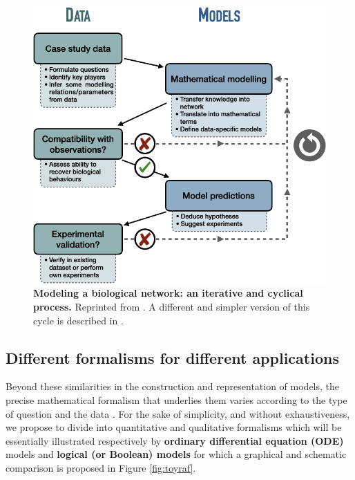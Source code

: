 \documentclass[a4paper,12pt,twoside,onecolumn,openright,final,oldfontcommands]{memoir}
\begin{document}
\begin{figure}

{\centering \includegraphics[width=0.7\linewidth]{fig/cycle} 

}

\caption[Modeling a biological network: an iterative and cyclical process]{\textbf{Modeling a biological network: an iterative
and cyclical process.} Reprinted from \citep{beal2020modelisation}. A
different and simpler version of this cycle is described in
\citep{le2015quantitative}.}\label{fig:cycle}
\end{figure}






\subsection{Different formalisms for different
applications}\label{different-formalisms-for-different-applications}

Beyond these similarities in the construction and representation of
models, the precise mathematical formalism that underlies them varies
according to the type of question and the data \citep{de2002modeling}.
For the sake of simplicity, and without exhaustiveness, we propose to
divide into quantitative and qualitative formalisms which will be
essentially illustrated respectively by \textbf{ordinary differential
equation (ODE)} models and \textbf{logical (or Boolean) models} for
which a graphical and schematic comparison is proposed in Figure
\ref{fig:toyraf}.
\end{document}

